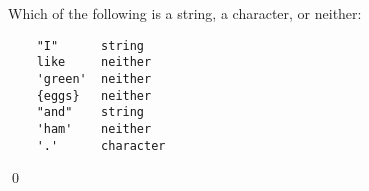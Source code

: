 Which of the following is a string, a character, or neither:
\begin{verbatim}
    "I"      string
    like     neither
    'green'  neither
    {eggs}   neither
    "and"    string
    'ham'    neither
    '.'      character
\end{verbatim}
\qed    

